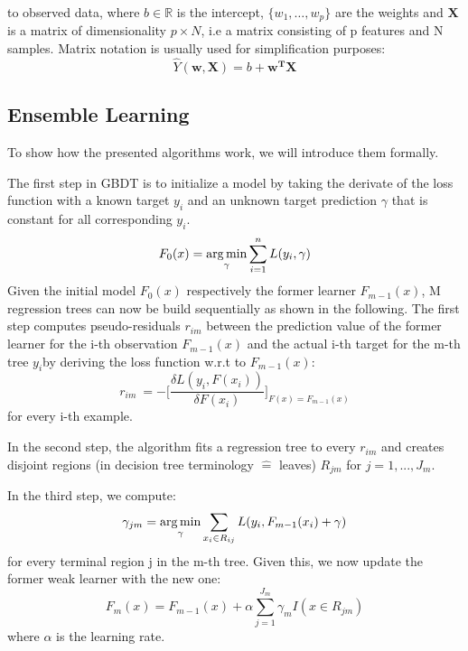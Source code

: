 to observed data, where $b \in \mathbb{R}$ is the intercept, $\{w_1, \dots, w_p\}$ are the weights and $\mathbf{X}$ is a matrix of dimensionality $p \times N$, i.e a matrix consisting of p features and N samples. Matrix notation is usually used for simplification purposes: 
\begin{equation}
	\hat Y(\mathbf{w},\mathbf{X}) = b + \mathbf{w^T}\mathbf{X}
\end{equation}

\subsection{Ensemble Learning}

To show how the presented algorithms work, we will introduce them formally.

The first step in GBDT is to initialize a model by taking the derivate of the loss function with a known target $ y_i $ and an unknown target prediction $ \gamma $ that is constant for all corresponding $ y_i $.
\begin{equation}
F_{0}(x) =  \operatorname*{arg\,min}_{\gamma} \sum_{i=1}^n L(y_i,\gamma) \label{gbdt_step1}
\end{equation}
Given the initial model $ F_0(x) $ respectively the former learner $ F_{m-1}(x) $, M regression trees can now be build sequentially as shown in the following. 
The first step computes pseudo-residuals $ r_{im} $ between the prediction value of the former learner for the i-th observation $ F_{m-1}(x) $ and the actual i-th target for the m-th tree $ y_i $by deriving the loss function w.r.t to $ F_{m-1}(x) $: 
\begin{equation}
	r_{im}\ = - \bigg[\dfrac{\delta L(y_i, F(x_i))}{\delta F(x_i)}\bigg]_{F(x) = F_{m-1}(x)}
\end{equation} 
for every i-th example.

In the second step, the algorithm fits a regression tree to every $ r_{im} $ and creates disjoint regions (in decision tree terminology $\widehat{=}$ \glqq leaves\grqq) $ R_{jm} $ for $j = 1, ..., J_m$. 

In the third step, we compute: 
\begin{equation}
	\gamma_{jm} = \operatorname*{arg\,min}_{\gamma} \sum_{x_i \in R_{ij}} L(y_i, F_{m-1}(x_i) + \gamma)
\end{equation}
for every terminal region j in the m-th tree. 
Given this, we now update the former weak learner with the new one:
\begin{equation}
	F_m(x) = F_{m-1}(x) + \alpha \sum_{j=1}^{J_m} \gamma_{m}I(x \in R_{jm})
\end{equation}
where $ \alpha $ is the learning rate.



